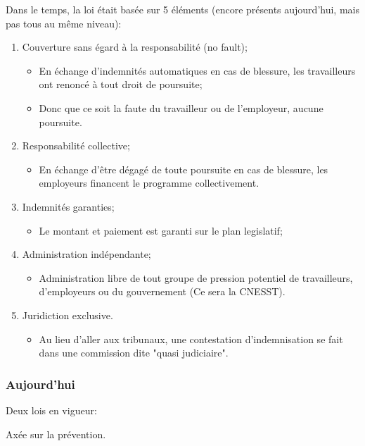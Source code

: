 \documentclass[10pt, french]{article}
\begin{document}
\begin{multicols*}{3}
Dans le temps, la loi était basée sur 5 éléments (encore présents aujourd'hui, mais pas tous au même niveau):
\begin{enumerate}
	\item	Couverture sans égard à la responsabilité (no fault);
		\begin{itemize}[leftmargin = *]
		\item	En échange d'indemnités automatiques en cas de blessure, les travailleurs ont renoncé à tout droit de poursuite;
		\item	Donc que ce soit la faute du travailleur ou de l'employeur, aucune poursuite.
		\end{itemize}
	\item	Responsabilité collective;
		\begin{itemize}[leftmargin = *]
		\item	En échange d'être dégagé de toute poursuite en cas de blessure, les employeurs financent le programme collectivement.
		\end{itemize}
	\item	Indemnités garanties;
		\begin{itemize}[leftmargin = *]
		\item	Le montant et paiement est garanti sur le plan legislatif;
		\end{itemize}
	\item	Administration indépendante;
		\begin{itemize}[leftmargin = *]
		\item	Administration libre de tout groupe de pression potentiel de travailleurs, d'employeurs ou du gouvernement (Ce sera la CNESST).
		\end{itemize}
	\item	Juridiction exclusive.
		\begin{itemize}[leftmargin = *]
		\item	Au lieu d'aller aux tribunaux, une contestation d'indemnisation se fait dans une commission dite "quasi judiciaire".
		\end{itemize}
\end{enumerate}


\subsubsection*{Aujourd'hui}
Deux lois en vigueur:

\begin{rappel_enhanced}
Axée sur la prévention.
\end{rappel_enhanced}


\end{multicols*}
\end{document}
